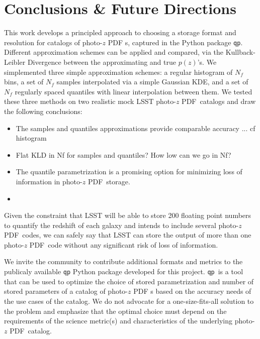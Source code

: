 \documentclass[\docopts]{\docclass}
\newcommand{\qp}{\texttt{qp}\xspace}
\newcommand{\pz}{photo-$z$ PDF\xspace}
\begin{document}
\section{Conclusions \& Future Directions}
\label{sec:conclusions}


This work develops a principled approach to choosing a storage format and
resolution for catalogs of \pz s, captured in the Python package \qp. Different approximation schemes can be applied and compared, via the Kullback-Leibler Divergence between the approximating and true $p(z)$'s. We simplemented three simple approximation schemes: a regular histogram of $N_f$ bins, a set of $N_f$ samples interpolated via a simple Gaussian KDE, and a set of $N_f$ regularly spaced quantiles with linear interpolation between them.
We tested these three methods on two realistic mock LSST \pz\ catalogs and draw the following conclusions:
\begin{itemize}
  \item The samples and quantiles approximations provide comparable accuracy ... cf histogram
  \item Flat KLD in Nf for samples and quantiles? How low can we go in Nf?
  \item The quantile parametrization is a promising
option for minimizing loss of information in \pz\ storage.
  \item
\end{itemize}

Given the constraint that LSST will be able to store 200 floating point
numbers to quantify the redshift of each galaxy and intends to include several
\pz\ codes, we can safely say that LSST can store the output of more than one
\pz\ code without any significant risk of loss of information.

We invite the community to contribute additional formats and metrics
to the publicaly available \qp Python package developed for this project.  \qp\ is a tool that can be used to optimize the choice of
stored parametrization and number of stored parameters of a catalog of \pz s
based on the accuracy needs of the use cases of the catalog.
We do not advocate for a one-size-fits-all solution to the problem and
emphasize that the optimal choice must depend on the requirements of the
science metric(s) and characteristics of the underlying \pz\ catalog.
\end{document}

